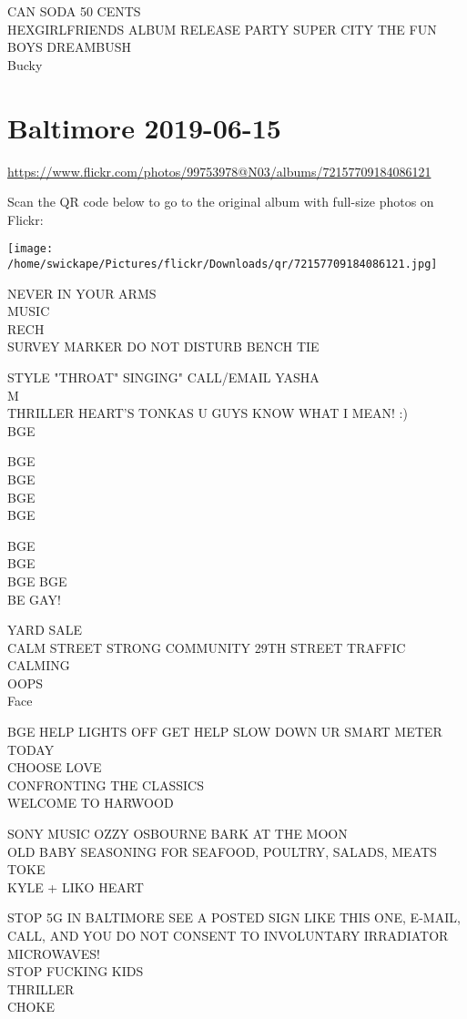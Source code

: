 \documentclass[10pt,letterpaper]{article}
\begin{document}
CAN SODA 50 CENTS\\
HEXGIRLFRIENDS ALBUM RELEASE PARTY SUPER CITY THE FUN BOYS DREAMBUSH\\
Bucky


\section*{Baltimore 2019-06-15}

\url{https://www.flickr.com/photos/99753978@N03/albums/72157709184086121}

Scan the QR code below to go to the original album with full-size photos on Flickr:

\texttt{[image: /home/swickape/Pictures/flickr/Downloads/qr/72157709184086121.jpg]}


NEVER IN YOUR ARMS\\
MUSIC\\
RECH\\
SURVEY MARKER DO NOT DISTURB BENCH TIE

STYLE "THROAT" SINGING" CALL/EMAIL YASHA\\
M\\
THRILLER HEART'S TONKAS U GUYS KNOW WHAT I MEAN!  :)\\
BGE

BGE\\
BGE\\
BGE\\
BGE

BGE\\
BGE\\
BGE BGE\\
BE GAY!

YARD SALE\\
CALM STREET STRONG COMMUNITY 29TH STREET TRAFFIC CALMING\\
OOPS\\
Face

BGE HELP LIGHTS OFF GET HELP SLOW DOWN UR SMART METER TODAY\\
CHOOSE LOVE\\
CONFRONTING THE CLASSICS\\
WELCOME TO HARWOOD

SONY MUSIC OZZY OSBOURNE BARK AT THE MOON\\
OLD BABY SEASONING FOR SEAFOOD, POULTRY, SALADS, MEATS\\
TOKE\\
KYLE + LIKO HEART

STOP 5G IN BALTIMORE SEE A POSTED SIGN LIKE THIS ONE, E{-}MAIL, CALL, AND YOU DO NOT CONSENT TO INVOLUNTARY IRRADIATOR MICROWAVES!\\
STOP FUCKING KIDS\\
THRILLER\\
CHOKE
\end{document}
